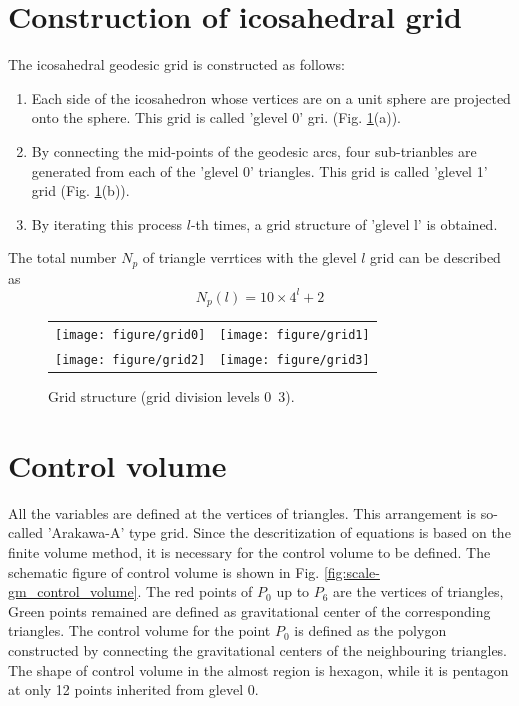 \section{Construction of icosahedral grid}
The icosahedral geodesic grid is constructed as follows:
\begin{enumerate}
  \item Each side of the icosahedron whose vertices are on a unit sphere are
    projected onto the sphere. This grid is called 'glevel 0' gri. (Fig. \ref{fig:scale-gm_grid}(a)).
  \item By connecting the mid-points of the geodesic arcs, four
      sub-trianbles are generated from each of the 'glevel 0' triangles. This
      grid is called 'glevel 1' grid (Fig. \ref{fig:scale-gm_grid}(b)).
  \item By iterating this process $l$-th times, a grid structure of 'glevel l'
    is obtained. 
\end{enumerate}
The total number $N_p$ of triangle verrtices with the glevel $l$ grid can be
described as 
\begin{equation}
  N_p(l) = 10 \times 4^l + 2 \nonumber
\end{equation}

\begin{figure}[H]
  \begin{center}
    \begin{tabular}{cc}
    \texttt{[image: figure/grid0]} &
    \texttt{[image: figure/grid1]} \\
    \texttt{[image: figure/grid2]} &
    \texttt{[image: figure/grid3]} 
    \end{tabular}
    \caption{Grid structure (grid division levels 0~3).}
    \label{fig:scale-gm_grid}
  \end{center}
\end{figure}


\section{Control volume}
All the  variables are defined at the vertices of triangles. This arrangement
is so-called 'Arakawa-A' type grid. Since the descritization of equations is
based on the finite volume method, it is necessary for the control volume to
be defined. The schematic figure of control volume is shown in Fig. \ref{fig:scale-gm_control_volume}. The
red points of $P_0$ up to $P_6$ are the vertices of triangles, Green points
remained are defined as gravitational center of the corresponding
triangles. The control volume for the point $P_0$ is defined as the polygon
constructed by connecting the gravitational centers of the neighbouring
triangles. The shape of control volume in the almost region is hexagon, while
it is pentagon at only 12 points inherited from glevel 0.

